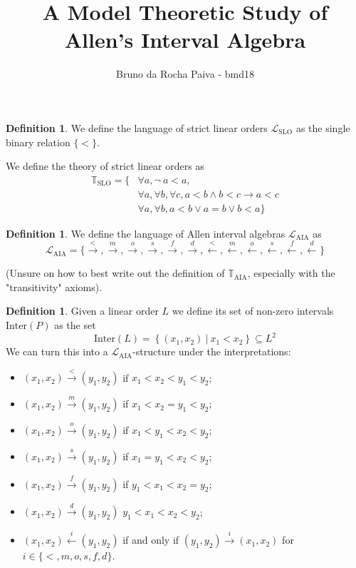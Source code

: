 \documentclass[11pt %
              ]{article}
\title{A Model Theoretic Study of Allen's Interval Algebra}
\author{Bruno da Rocha Paiva - bmd18}
\date{} %
\newcommand{\lang}{\mathcal{L}}
\newcommand{\theory}{\mathbb{T}}
\newcommand{\laia}{\lang_\text{AIA}}
\newcommand{\taia}{\theory_\text{AIA}}
\newcommand{\inter}[1]{\text{Inter}\left(#1\right)}
\newcommand{\lslo}{\lang_\text{SLO}}
\newcommand{\tslo}{\theory_\text{SLO}}
\newcommand{\before}{\overset{<}{\longrightarrow}}
\newcommand{\meets}{\overset{m}{\longrightarrow}}
\newcommand{\overlaps}{\overset{o}{\longrightarrow}}
\newcommand{\starts}{\overset{s}{\longrightarrow}}
\newcommand{\finishes}{\overset{f}{\longrightarrow}}
\newcommand{\contained}{\overset{d}{\longrightarrow}}
\newcommand{\after}{\overset{<}{\longleftarrow}}
\newcommand{\metby}{\overset{m}{\longleftarrow}}
\newcommand{\overlappedby}{\overset{o}{\longleftarrow}}
\newcommand{\startedby}{\overset{s}{\longleftarrow}}
\newcommand{\finishedby}{\overset{f}{\longleftarrow}}
\newcommand{\contains}{\overset{d}{\longleftarrow}}
\theoremstyle{plain}
\theoremstyle{definition}
\newtheorem{defn}[thm]{Definition}
\theoremstyle{remark}
\begin{document}
\maketitle

\begin{defn}
  We define the language of strict linear orders $\lslo$ as the single binary relation $\{ < \}$.

  We define the theory of strict linear orders as
  \begin{align*}
    \tslo = \{ & \forall a, \lnot\ a < a, \\
              & \forall a, \forall b, \forall c, a < b \land b < c \rightarrow a < c \\
              & \forall a, \forall b, a < b \lor a = b \lor b < a \}
  \end{align*}
\end{defn}

\begin{defn}
  We define the language of Allen interval algebras $\laia$ as 
  \begin{equation*}
    \laia = \{ \before, \meets, \overlaps, \starts, \finishes, \contained,
               \after, \metby, \overlappedby, \startedby, \finishedby, \contains \}
  \end{equation*}

  (Unsure on how to best write out the definition of $\taia$, especially with the "transitivity"
  axioms).
\end{defn}


\begin{defn}
  Given a linear order $L$ we define its set of non-zero intervals $\inter{P}$ as the set
  \begin{equation*}
    \inter{L} = \left\{(x_1,x_2)\ |\ x_1 < x_2 \right\} \subseteq L^2
  \end{equation*}
  We can turn this into a $\laia$-structure under the interpretations:
  \begin{itemize}
    \item $(x_1,x_2) \before (y_1,y_2)$ if $x_1<x_2<y_1<y_2$;
    \item $(x_1,x_2) \meets (y_1,y_2)$ if $x_1<x_2=y_1<y_2$;
    \item $(x_1,x_2) \overlaps (y_1,y_2)$ if $x_1<y_1<x_2<y_2$;
    \item $(x_1,x_2) \starts (y_1,y_2)$ if $x_1=y_1<x_2<y_2$;
    \item $(x_1,x_2) \finishes (y_1,y_2)$ if $y_1<x_1<x_2=y_2$;
    \item $(x_1,x_2) \contained (y_1,y_2)$ $y_1<x_1<x_2<y_2$;
    \item $(x_1,x_2) \overset{i}{\longleftarrow} (y_1,y_2)$ if and only if
      $(y_1,y_2) \overset{i}{\longrightarrow} (x_1,x_2)$ for $i \in \{<,m,o,s,f,d\}$.
  \end{itemize}
\end{defn}
\end{document}

